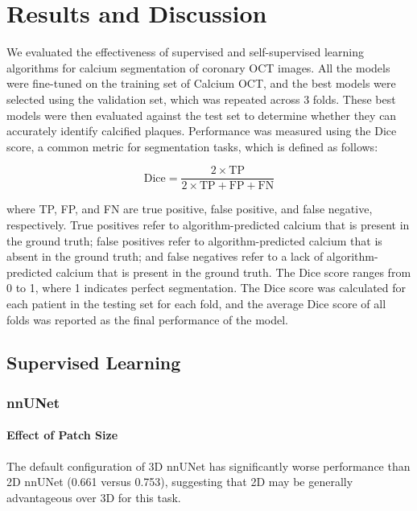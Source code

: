\documentclass[a4paper,11pt,oneside]{report}
\begin{document}
\chapter{Results and Discussion}


We evaluated the effectiveness of supervised and self-supervised learning algorithms for calcium segmentation of coronary OCT images. All the models were fine-tuned on the training set of Calcium OCT, and the best models were selected using the validation set, which was repeated across 3 folds. These best models were then evaluated against the test set to determine whether they can accurately identify calcified plaques. Performance was measured using the Dice score, a common metric for segmentation tasks, which is defined as follows:

\begin{equation}
    \text{Dice} = \frac{2 \times \text{TP}}{2 \times \text{TP} + \text{FP} + \text{FN}}
\end{equation}

where TP, FP, and FN are true positive, false positive, and false negative, respectively. True positives refer to algorithm-predicted calcium that is present in the ground truth; false positives refer to algorithm-predicted calcium that is absent in the ground truth; and false negatives refer to a lack of algorithm-predicted calcium that is present in the ground truth. The Dice score ranges from 0 to 1, where 1 indicates perfect segmentation. The Dice score was calculated for each patient in the testing set for each fold, and the average Dice score of all folds was reported as the final performance of the model.

\section{Supervised Learning}
\subsection{nnUNet}\label{sec:result:nnunet}
\subsubsection{Effect of Patch Size}
The default configuration of 3D nnUNet has significantly worse performance than 2D nnUNet (0.661 versus 0.753), suggesting that 2D may be generally advantageous over 3D for this task. 
\end{document}
